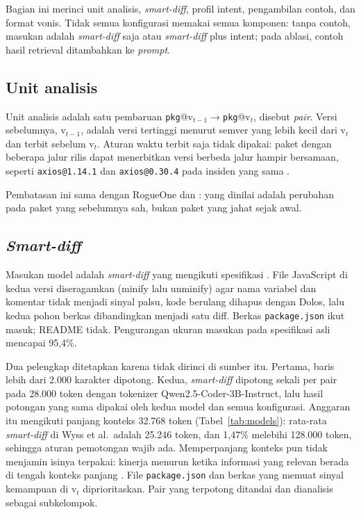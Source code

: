 \documentclass[a4paper,fleqn]{cas-dc}
\begin{document}
Bagian ini merinci unit analisis, \emph{smart-diff}, profil intent, pengambilan
contoh, dan format vonis. Tidak semua konfigurasi memakai semua komponen:
tanpa contoh, masukan adalah \emph{smart-diff} saja atau \emph{smart-diff}
plus intent; pada ablasi, contoh hasil retrieval ditambahkan ke
\emph{prompt}.

\subsection{Unit analisis}

Unit analisis adalah satu pembaruan
\texttt{pkg}@$\mathrm{v}_{t-1}\!\rightarrow$\texttt{pkg}@$\mathrm{v}_{t}$,
disebut \emph{pair}. Versi
sebelumnya, $\mathrm{v}_{t-1}$, adalah versi tertinggi menurut semver yang lebih
kecil dari $\mathrm{v}_t$ dan terbit sebelum $\mathrm{v}_t$. Aturan waktu terbit
saja tidak dipakai: paket dengan beberapa jalur rilis dapat menerbitkan versi
berbeda jalur hampir bersamaan, seperti \texttt{axios@1.14.1} dan
\texttt{axios@0.30.4} pada insiden yang sama \citep{datadog2026axios}.

Pembatasan ini sama dengan RogueOne dan \citet{wyss2025evaluating}: yang dinilai
adalah perubahan pada paket yang sebelumnya sah, bukan paket yang jahat sejak
awal.

\subsection{\emph{Smart-diff}}

Masukan model adalah \emph{smart-diff} yang mengikuti spesifikasi
\citet{wyss2025evaluating}. File JavaScript di kedua versi diseragamkan
(minify lalu unminify) agar nama variabel dan komentar tidak menjadi sinyal
palsu, kode berulang dihapus dengan Dolos, lalu kedua pohon berkas dibandingkan
menjadi satu diff. Berkas \texttt{package.json} ikut masuk; README tidak.
Pengurangan ukuran masukan pada spesifikasi asli mencapai 95,4\%.

Dua pelengkap ditetapkan karena tidak dirinci di sumber itu. Pertama, baris
lebih dari 2.000 karakter dipotong. Kedua, \emph{smart-diff} dipotong sekali per
pair pada 28.000 token dengan tokenizer Qwen2.5-Coder-3B-Instruct, lalu hasil
potongan yang sama dipakai oleh kedua model dan semua konfigurasi. Anggaran itu
mengikuti panjang konteks 32.768 token (Tabel~\ref{tab:models}): rata-rata
\emph{smart-diff} di Wyss et al.\ adalah 25.246 token, dan 1,47\% melebihi
128.000 token, sehingga aturan pemotongan wajib ada. Memperpanjang konteks pun
tidak menjamin isinya terpakai: kinerja menurun ketika informasi yang relevan
berada di tengah konteks panjang \citep{liu2024lost}. File
\texttt{package.json} dan berkas yang memuat sinyal kemampuan di $\mathrm{v}_t$
diprioritaskan. Pair yang terpotong ditandai dan dianalisis sebagai subkelompok.
\end{document}
